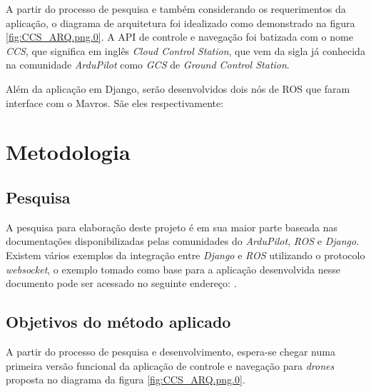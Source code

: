 \documentclass[12pt,a4paper,oneside]{book}
\begin{document}
A partir do processo de pesquisa e também considerando os requerimentos da aplicação, o diagrama de arquitetura foi idealizado como demonstrado na figura \ref{fig:CCS_ARQ.png.0}. A API de controle e navegação foi batizada com o nome \textit{CCS}, que significa em inglês \textit{Cloud Control Station}, que vem da sigla já conhecida na comunidade \textit{ArduPilot} como \textit{GCS} de \textit{Ground Control Station}.   

Além da aplicação em Django, serão desenvolvidos dois nós de ROS que faram interface com o Mavros. Sãe eles respectivamente:  




\chapter{Metodologia}
\label{chapter:Metodologia}
%
\thispagestyle{empty} 
%
\section{Pesquisa}
%
A pesquisa para elaboração deste projeto é em sua maior parte baseada nas documentações disponibilizadas pelas comunidades do \textit{ArduPilot}, \textit{ROS} e \textit{Django}. Existem vários exemplos da integração entre \textit{Django} e \textit{ROS} utilizando o protocolo \textit{websocket}, o exemplo tomado como base para a aplicação desenvolvida nesse documento pode ser acessado no seguinte endereço: \cite{url:django_ros}.
%
\section{Objetivos do método aplicado}
A partir do processo de pesquisa e desenvolvimento, espera-se chegar numa primeira versão funcional da aplicação de controle e navegação para \textit{drones} proposta no diagrama da figura \ref{fig:CCS_ARQ.png.0}.
\end{document}
